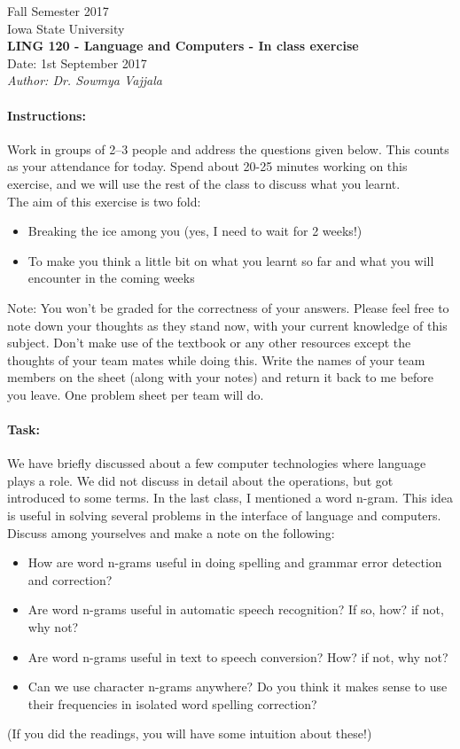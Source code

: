 \documentclass[11pt,a4paper]{article}
\begin{document}
\begin{center}
Fall Semester 2017 \\ Iowa State University \\[1ex]
\textbf{LING 120 - Language and Computers - In class exercise}
\\ Date: 1st September 2017 \\
\textit{Author: Dr. Sowmya Vajjala}
\end{center}

\paragraph{Instructions: } 
Work in groups of 2--3 people and address the questions given below. This counts as your attendance for today. Spend about 20-25 minutes working on this exercise, and we will use the rest of the class to discuss what you learnt. 
\\ The aim of this exercise is two fold:
\begin{itemize}
\item Breaking the ice among you (yes, I need to wait for 2 weeks!)
\item To make you think a little bit on what you learnt so far and what you will encounter in the coming weeks
\end{itemize}
Note: You won't be graded for the correctness of your answers. Please feel free to note down your thoughts as they stand now, with your current knowledge of this subject. Don't make use of the textbook or any other resources except the thoughts of your team mates while doing this. Write the names of your team members on the sheet (along with your notes) and return it back to me before you leave. One problem sheet per team will do. 

\paragraph{Task: }
We have briefly discussed about a few computer technologies where language plays a role. We did not discuss in detail about the operations, but got introduced to some terms. In the last class, I mentioned a word n-gram. This idea is useful in solving several problems in the interface of language and computers. Discuss among yourselves and make a note on the following:
\begin{itemize}
\item How are word n-grams useful in doing spelling and grammar error detection and correction?
\item Are word n-grams useful in automatic speech recognition? If so, how? if not, why not?
\item Are word n-grams useful in text to speech conversion? How? if not, why not?
\item Can we use character n-grams anywhere? Do you think it makes sense to use their frequencies in isolated word spelling correction?
\end{itemize}
(If you did the readings, you will have some intuition about these!)
\end{document}
